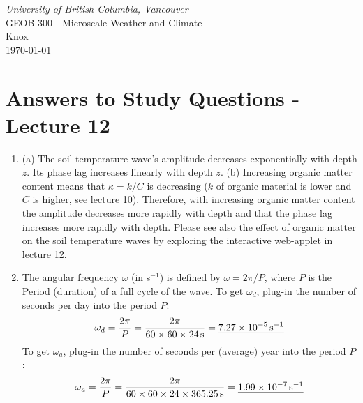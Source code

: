 \documentclass[11pt]{article}
\author{Andy Black and Andreas Christen}
\begin{document}
\begin{center}
\emph{University of British Columbia, Vancouver}\\
GEOB 300 - Microscale Weather and Climate\\
Knox\\
\today
\section*{Answers to Study Questions - Lecture 12}
\end{center}

\begin{enumerate}

\item (a) The soil temperature wave's amplitude decreases exponentially with depth $z$. Its phase lag
increases linearly with depth $z$. (b) Increasing organic matter content means that $\kappa = k/C$ is decreasing ($k$ of organic material is lower and $C$ is higher, see lecture 10). Therefore, with increasing organic matter content the amplitude
decreases more rapidly with depth and that the phase lag increases more rapidly with depth. Please see also the effect of organic matter on the soil temperature waves by exploring the interactive web-applet in lecture 12.

\item The angular frequency $\omega$ (in s$^{-1}$) is defined by $\omega = 2 \pi / P$, where $P$ is the Period (duration) of a full cycle of the wave. To get $\omega_d$, plug-in the number of seconds per day into the period $P$:
\begin{eqnarray*} 
\omega_d = \frac{2 \pi}{P} = \frac{2 \pi}{60 \times 60 \times 24\,\rm{s}} =  \underline{7.27 \times 10^{-5}\,\rm{s}^{-1}}
\end{eqnarray*} 
To get $\omega_a$, plug-in the number of seconds per (average) year into the period $P$:
\begin{eqnarray*} 
\omega_a = \frac{2 \pi}{P} = \frac{2 \pi}{60 \times 60 \times 24 \times 365.25 \,\rm{s}} =  \underline{1.99 \times 10^{-7}\,\rm{s}^{-1}}
\end{eqnarray*} 


\end{enumerate}
\end{document}
